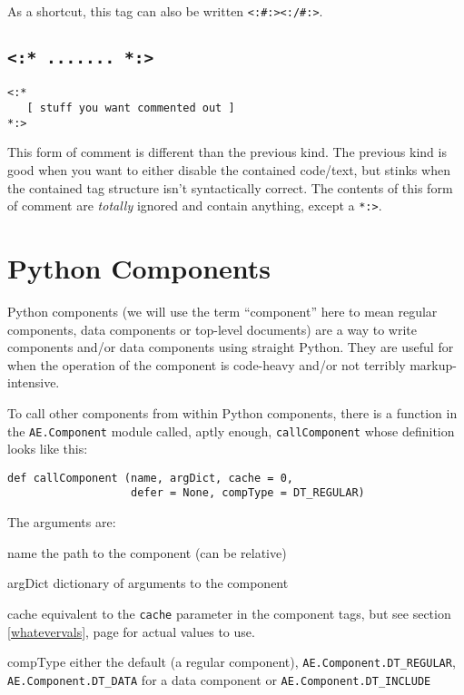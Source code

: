 \documentclass{manual}
\begin{document}
As a shortcut, this tag can also be written
\texttt{<:\#:><:/\#:>}.

   


\section{\texttt{<:* ....... *:>}}
\label{fullcomment}
\begin{verbatim}
<:*
   [ stuff you want commented out ]
*:>
\end{verbatim}

This form of comment is different than the previous kind.  The
previous kind is good when you want to either disable the contained
code/text, but stinks when the contained tag structure isn't
syntactically correct.  The contents of this form of comment are
\emph{totally} ignored and contain anything, except a \texttt{*:>}.


\chapter{Python Components}
\label{pythoncode}
Python components (we will use the term ``component'' here to mean
regular components, data components or top-level documents) 
are a way to write components and/or data components using straight
Python.  They are useful for when the operation of the component is
code-heavy and/or not terribly markup-intensive.

To call other components from within Python components, there is a
function in the \texttt{AE.Component} module called, aptly enough,
\texttt{callComponent} whose definition looks like this:

\begin{verbatim}
def callComponent (name, argDict, cache = 0,
                   defer = None, compType = DT_REGULAR)
\end{verbatim}

The arguments are:
\begin{argdesc}
\item[name] the path to the component (can be relative)
\item[argDict] dictionary of arguments to the component
\item[cache] equivalent to the \texttt{cache} parameter in the
component tags, but see section \ref{whatevervals}, page
\pageref{whatevervals} for actual values to use.
\item[compType] either the default (a regular
component), \texttt{AE.Component.DT_REGULAR},
\texttt{AE.Component.DT_DATA} for a data component or
\texttt{AE.Component.DT_INCLUDE}
\end{argdesc}
\end{document}
